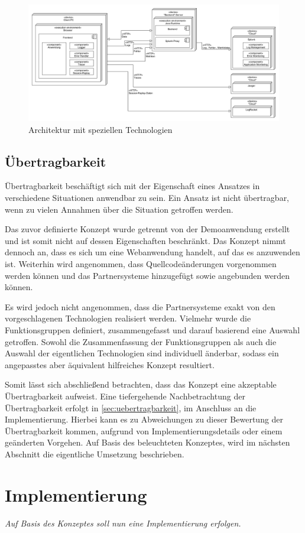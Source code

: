 \begin{figure}[H]
	\centering
	\includegraphics[width=1.00\linewidth]{img/04_erstellung-poc/konzept-technologien.png}
	\caption{Architektur mit speziellen Technologien}
	\label{fig:architektur-technologien}
\end{figure}

	\subsection{Übertragbarkeit}
	
	Übertragbarkeit beschäftigt sich mit der Eigenschaft eines Ansatzes in verschiedene Situationen anwendbar zu sein. Ein Ansatz ist nicht übertragbar, wenn zu vielen Annahmen über die Situation getroffen werden.
	
	Das zuvor definierte Konzept wurde getrennt von der Demoanwendung erstellt und ist somit nicht auf dessen Eigenschaften beschränkt. Das Konzept nimmt dennoch an, dass es sich um eine Webanwendung handelt, auf das es anzuwenden ist. Weiterhin wird angenommen, dass Quellcodeänderungen vorgenommen werden können und das Partnersysteme hinzugefügt sowie angebunden werden können.
	
	Es wird jedoch nicht angenommen, dass die Partnersysteme exakt von den vorgeschlagenen Technologien realisiert werden. Vielmehr wurde die Funktionsgruppen definiert, zusammengefasst und darauf basierend eine Auswahl getroffen. Sowohl die Zusammenfassung der Funktionsgruppen als auch die Auswahl der eigentlichen Technologien sind individuell änderbar, sodass ein angepasstes aber äquivalent hilfreiches Konzept resultiert.
	
	Somit lässt sich abschließend betrachten, dass das Konzept eine akzeptable Übertragbarkeit aufweist. Eine tiefergehende Nachbetrachtung der Übertragbarkeit erfolgt in \autoref{sec:uebertragbarkeit}, im Anschluss an die Implementierung. Hierbei kann es zu Abweichungen zu dieser Bewertung der Übertragbarkeit kommen, aufgrund von Implementierungsdetails oder einem geänderten Vorgehen. Auf Basis des beleuchteten Konzeptes, wird im nächsten Abschnitt die eigentliche Umsetzung beschrieben.

\section{Implementierung}
% 

	\textit{Auf Basis des Konzeptes soll nun eine Implementierung erfolgen.}